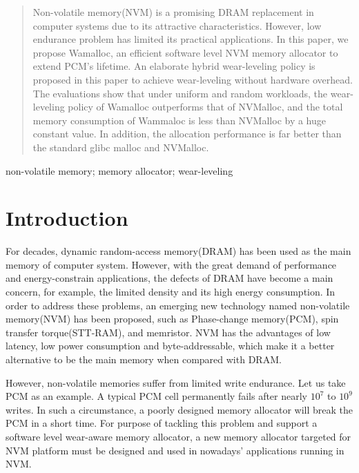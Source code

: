 \documentclass[10pt, conference, compsocconf]{IEEEtran}
\begin{document}




\maketitle


\begin{abstract}
Non-volatile memory(NVM) is a promising DRAM replacement in computer systems due to its attractive characteristics.
However, low endurance problem has limited its practical applications.
In this paper, we propose Wamalloc, an efficient software level NVM memory allocator to extend PCM's lifetime.
An elaborate hybrid wear-leveling policy is proposed in this paper to achieve wear-leveling without hardware overhead.
The evaluations show that under uniform and random workloads,
the wear-leveling policy of Wamalloc outperforms that of NVMalloc,
and the total memory consumption of Wammaloc is less than NVMalloc by a huge constant value.
In addition, the allocation performance is far better than the standard glibc malloc and NVMalloc.

\end{abstract}

\begin{IEEEkeywords}
non-volatile memory; memory allocator; wear-leveling

\end{IEEEkeywords}

\section{Introduction}

For decades, dynamic random-access memory(DRAM) has been used as the main memory of computer system.
However, with the great demand of performance and energy-constrain applications, the defects of DRAM have become a main concern,
for example, the limited density and its high energy consumption. 
In order to address these problems, an emerging new technology named non-volatile memory(NVM) has been proposed, such as Phase-change memory(PCM), spin transfer torque(STT-RAM), and memristor. 
NVM has the advantages of low latency, low power consumption and byte-addressable,
which make it a better alternative to be the main memory when compared with DRAM.

However, non-volatile memories suffer from limited write endurance. 
Let us take PCM as an example. A typical PCM cell permanently fails after nearly $10^7$ to $10^9$ writes. 
In such a circumstance, a poorly designed memory allocator will break the PCM in a short time. 
For purpose of tackling this problem and support a software level wear-aware memory allocator,
a new memory allocator targeted for NVM platform must be designed and used in nowadays’ applications running in NVM.
\end{document}
